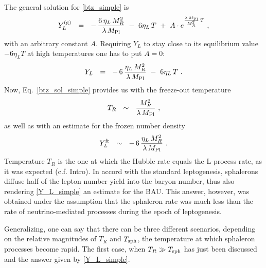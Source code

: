 \documentclass[12pt]{revtex4}
\newcommand{\Mpl}{M_{\rm Pl}}
\newcommand{\Tsph}{T_{\rm sph}}
\begin{document}
	The general solution for \eqref{btz_simple} is
\[
	Y_L^{(\rm g)} ~~=~~ -\,\frac{6\,\eta_L\,M_R^2}{\lambda\,\Mpl}
		~-~ 6\eta_L\,T ~+~
		A\cdot e^{\frac{\lambda\, \Mpl}{M_R^2}\, T}~,
\]
	with an arbitrary constant $ A $.
	Requiring $ Y_L $ to stay close to its equilibrium value 
	$ - 6\eta_L T $ at high temperatures one has to 
	put $ A = 0 $:
\begin{equation}
\label{btz_sol_simple}
	Y_L ~~=~~ -\,6\,\frac{\eta_L\,M_R^2}{\lambda\,\Mpl}
		~-~ 6\eta_L\,T ~.
\end{equation}
	Now, Eq.~\eqref{btz_sol_simple} provides us with the freeze-out
	temperature
\begin{equation}
\label{T_R}
	T_R ~~\sim~~ \frac{M_R^2}{\lambda\,\Mpl}~,
\end{equation}
	as well as with an estimate for the frozen number density
\begin{equation}
\label{Y_L_simple}
	Y_L^{\rm fr} ~~\sim~~ -\, 6\,\frac{\eta_L\,M_R^2}{\lambda\,\Mpl}~.
\end{equation}
	Temperature $ T_R $ is the one at which the Hubble rate equals 
	the L-process rate, as it was expected (c.f. Intro).
	In accord with the standard leptogenesis, sphalerons diffuse
	half of the lepton number yield into the baryon number, thus also
	rendering \eqref{Y_L_simple} an estimate for the BAU.
	This answer, however, was obtained under the assumption that
	the sphaleron rate was much less than the rate of 
	neutrino-mediated processes during the epoch of leptogenesis.
	
	Generalizing, one can say that there can be three different scenarios, 
	depending on the relative magnitudes of $ T_R $ and $ \Tsph $, the 
	temperature at which sphaleron processes become rapid.
	The first case, when $ T_R \gg \Tsph $ has just been discussed
	and the answer given by \eqref{Y_L_simple}.
	
\end{document}
